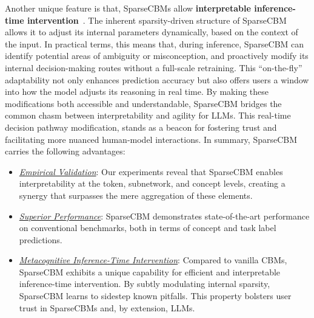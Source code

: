 \documentclass[letterpaper]{article} %
\begin{document}
Another unique feature is that, SparseCBMs allow \textbf{interpretable inference-time intervention}~\citep{koh2020concept,li2023inference}. The inherent sparsity-driven structure of SparseCBM allows it to adjust its internal parameters dynamically, based on the context of the input. In practical terms, this means that, during inference, SparseCBM can identify potential areas of ambiguity or misconception, and proactively modify its internal decision-making routes without a full-scale retraining. This ``on-the-fly'' adaptability not only enhances prediction accuracy but also offers users a window into how the model adjusts its reasoning in real time. By making these modifications both accessible and understandable, SparseCBM bridges the common chasm between interpretability and agility for LLMs. This real-time decision pathway modification,
stands as a beacon for fostering trust and facilitating more nuanced human-model interactions. In summary, SparseCBM carries the following advantages:
\begin{itemize}
    \item \underline{\textit{Empirical Validation}}: Our experiments reveal that SparseCBM enables interpretability at the token, subnetwork, and concept levels, creating a synergy that surpasses the mere aggregation of these elements.
    \item \underline{\textit{Superior Performance}}: SparseCBM demonstrates state-of-the-art performance on conventional benchmarks, both in terms of concept and task label predictions.
    \item \underline{\textit{Metacognitive Inference-Time Intervention}}: Compared to vanilla CBMs, SparseCBM exhibits a unique capability for efficient and interpretable inference-time intervention. By subtly modulating internal sparsity, SparseCBM learns to sidestep known pitfalls. This property bolsters user trust in SparseCBMs and, by extension, LLMs.
    
\end{itemize}
\end{document}
